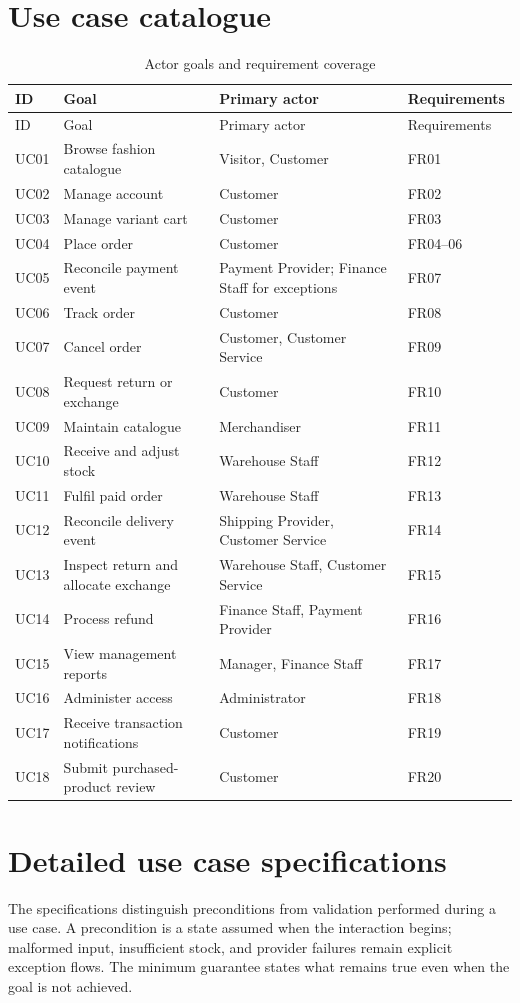 \section{Use case catalogue}
\begin{longtable}{P{.09\linewidth}P{.32\linewidth}P{.23\linewidth}P{.25\linewidth}}
\caption{Actor goals and requirement coverage}\label{tab:ucs}\\
\toprule ID & Goal & Primary actor & Requirements \\\midrule\endfirsthead
\toprule ID & Goal & Primary actor & Requirements \\\midrule\endhead
UC01 & Browse fashion catalogue & Visitor, Customer & FR01\\
UC02 & Manage account & Customer & FR02\\
UC03 & Manage variant cart & Customer & FR03\\
UC04 & Place order & Customer & FR04--06\\
UC05 & Reconcile payment event & Payment Provider; Finance Staff for exceptions & FR07\\
UC06 & Track order & Customer & FR08\\
UC07 & Cancel order & Customer, Customer Service & FR09\\
UC08 & Request return or exchange & Customer & FR10\\
UC09 & Maintain catalogue & Merchandiser & FR11\\
UC10 & Receive and adjust stock & Warehouse Staff & FR12\\
UC11 & Fulfil paid order & Warehouse Staff & FR13\\
UC12 & Reconcile delivery event & Shipping Provider, Customer Service & FR14\\
UC13 & Inspect return and allocate exchange & Warehouse Staff, Customer Service & FR15\\
UC14 & Process refund & Finance Staff, Payment Provider & FR16\\
UC15 & View management reports & Manager, Finance Staff & FR17\\
UC16 & Administer access & Administrator & FR18\\
UC17 & Receive transaction notifications & Customer & FR19\\
UC18 & Submit purchased-product review & Customer & FR20\\
\bottomrule
\end{longtable}

\section{Detailed use case specifications}
The specifications distinguish preconditions from validation performed during a use case. A precondition is a state assumed when the interaction begins; malformed input, insufficient stock, and provider failures remain explicit exception flows. The minimum guarantee states what remains true even when the goal is not achieved.

